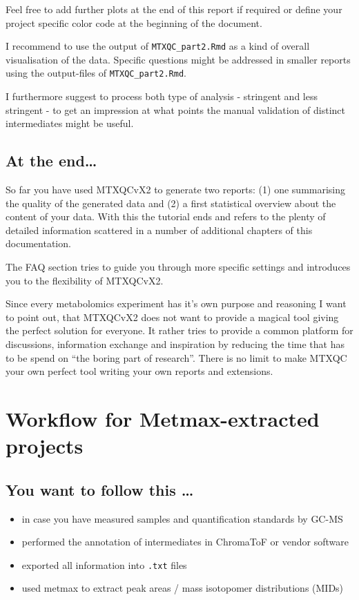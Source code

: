 \documentclass[]{book}
\providecommand{\tightlist}{%
  \setlength{\itemsep}{0pt}\setlength{\parskip}{0pt}}
\theoremstyle{definition}
\theoremstyle{definition}
\theoremstyle{definition}
\theoremstyle{remark}
\begin{document}
Feel free to add further plots at the end of this report if required or
define your project specific color code at the beginning of the
document.

I recommend to use the output of \texttt{MTXQC\_part2.Rmd} as a kind of
overall visualisation of the data. Specific questions might be addressed
in smaller reports using the output-files of \texttt{MTXQC\_part2.Rmd}.

I furthermore suggest to process both type of analysis - stringent and
less stringent - to get an impression at what points the manual
validation of distinct intermediates might be useful.

\section{At the end\ldots{}}\label{at-the-end}

So far you have used MTXQCvX2 to generate two reports: (1) one
summarising the quality of the generated data and (2) a first
statistical overview about the content of your data. With this the
tutorial ends and refers to the plenty of detailed information scattered
in a number of additional chapters of this documentation.

The FAQ section tries to guide you through more specific settings and
introduces you to the flexibility of MTXQCvX2.

Since every metabolomics experiment has it's own purpose and reasoning I
want to point out, that MTXQCvX2 does not want to provide a magical tool
giving the perfect solution for everyone. It rather tries to provide a
common platform for discussions, information exchange and inspiration by
reducing the time that has to be spend on ``the boring part of
research''. There is no limit to make MTXQC your own perfect tool
writing your own reports and extensions.

\chapter{Workflow for Metmax-extracted projects}\label{wf:metmax}

\section{You want to follow this
\ldots{}}\label{you-want-to-follow-this}

\begin{itemize}
\tightlist
\item
  in case you have measured samples and quantification standards by
  GC-MS
\item
  performed the annotation of intermediates in ChromaToF or vendor
  software
\item
  exported all information into \texttt{.txt} files
\item
  used metmax to extract peak areas / mass isotopomer distributions
  (MIDs)
\end{itemize}
\end{document}
